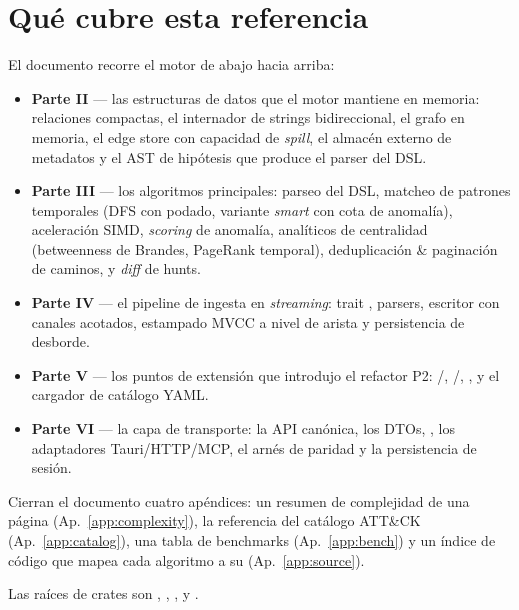 \section{Qué cubre esta referencia}

El documento recorre el motor de abajo hacia arriba:

\begin{itemize}
    \item \textbf{Parte II} --- las estructuras de datos que el
        motor mantiene en memoria: relaciones compactas, el
        internador de strings bidireccional, el grafo en memoria,
        el edge store con capacidad de \emph{spill}, el almacén
        externo de metadatos y el AST de hipótesis que produce el
        parser del DSL.
    \item \textbf{Parte III} --- los algoritmos principales:
        parseo del DSL, matcheo de patrones temporales (DFS con
        podado, variante \emph{smart} con cota de anomalía),
        aceleración SIMD, \emph{scoring} de anomalía, analíticos
        de centralidad (betweenness de Brandes, PageRank
        temporal), deduplicación \& paginación de caminos, y
        \emph{diff} de hunts.
    \item \textbf{Parte IV} --- el pipeline de ingesta en
        \emph{streaming}: trait , parsers,
        escritor con canales acotados, estampado MVCC a nivel de
        arista y persistencia de desborde.
    \item \textbf{Parte V} --- los puntos de extensión que
        introdujo el refactor P2: /,
        /,
        ,  y el
        cargador de catálogo YAML.
    \item \textbf{Parte VI} --- la capa de transporte: la API
        canónica, los DTOs, , los adaptadores
        Tauri/HTTP/MCP, el arnés de paridad y la persistencia de
        sesión.
\end{itemize}

Cierran el documento cuatro apéndices: un resumen de complejidad
de una página (Ap.~\ref{app:complexity}), la referencia del
catálogo ATT\&CK (Ap.~\ref{app:catalog}), una tabla de
benchmarks (Ap.~\ref{app:bench}) y un índice de código que mapea
cada algoritmo a su  (Ap.~\ref{app:source}).

\begin{inthecode}
Las raíces de crates son ,
,
,
 y
.
\end{inthecode}
